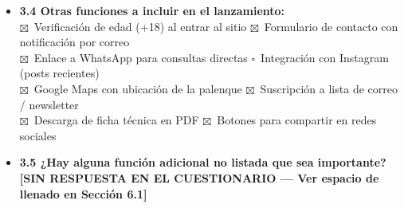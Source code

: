\documentclass[11pt,letterpaper]{article}
\newcommand{\uchk}{$\square$}
\newcommand{\chk}{\textcolor{mezcalAgave}{$\boxtimes$}}
\begin{document}
\begin{itemize}[leftmargin=1.5em]
    \item \textbf{3.4 Otras funciones a incluir en el lanzamiento:}\\
    \chk\ Verificación de edad (+18) al entrar al sitio \quad
    \chk\ Formulario de contacto con notificación por correo \\
    \chk\ Enlace a WhatsApp para consultas directas \quad
    \uchk\ Integración con Instagram (posts recientes) \\
    \chk\ Google Maps con ubicación de la palenque \quad
    \chk\ Suscripción a lista de correo / newsletter \\
    \chk\ Descarga de ficha técnica en PDF \quad
    \chk\ Botones para compartir en redes sociales

    \item \textbf{3.5 ¿Hay alguna función adicional no listada que sea importante?}\\
    \textcolor{red!80!black}{\textbf{[SIN RESPUESTA EN EL CUESTIONARIO — Ver espacio de llenado en Sección 6.1]}}
\end{itemize}
\end{document}
